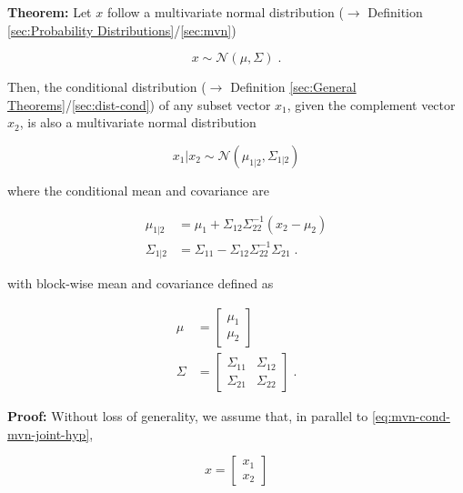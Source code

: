 \documentclass[a4paper,12pt,twoside]{book}
\begin{document}
\textbf{Theorem:} Let $x$ follow a multivariate normal distribution ($\rightarrow$ Definition \ref{sec:Probability Distributions}/\ref{sec:mvn})

\begin{equation} \label{eq:mvn-cond-mvn}
x \sim \mathcal{N}(\mu, \Sigma) \; .
\end{equation}

Then, the conditional distribution ($\rightarrow$ Definition \ref{sec:General Theorems}/\ref{sec:dist-cond}) of any subset vector $x_1$, given the complement vector $x_2$, is also a multivariate normal distribution

\begin{equation} \label{eq:mvn-cond-mvn-cond}
x_1|x_2 \sim \mathcal{N}(\mu_{1|2}, \Sigma_{1|2})
\end{equation}

where the conditional mean and covariance are

\begin{equation} \label{eq:mvn-cond-mvn-cond-hyp}
\begin{split}
\mu_{1|2} &= \mu_1 + \Sigma_{12} \Sigma_{22}^{-1} (x_2 - \mu_2) \\
\Sigma_{1|2} &= \Sigma_{11} - \Sigma_{12} \Sigma_{22}^{-1} \Sigma_{21} \; .
\end{split}
\end{equation}

with block-wise mean and covariance defined as

\begin{equation} \label{eq:mvn-cond-mvn-joint-hyp}
\begin{split}
\mu &= \begin{bmatrix} \mu_1 \\ \mu_2 \end{bmatrix} \\
\Sigma &= \begin{bmatrix} \Sigma_{11} & \Sigma_{12} \\ \Sigma_{21} & \Sigma_{22} \end{bmatrix} \; .
\end{split}
\end{equation}


\vspace{1em}
\textbf{Proof:} Without loss of generality, we assume that, in parallel to \eqref{eq:mvn-cond-mvn-joint-hyp},

\begin{equation} \label{eq:mvn-cond-x}
x = \begin{bmatrix} x_1 \\ x_2 \end{bmatrix}
\end{equation}
\end{document}
